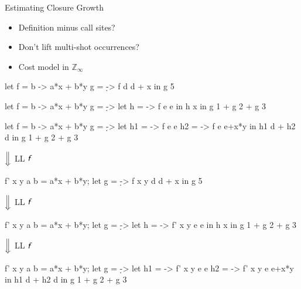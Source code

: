 \documentclass{haskellbeamer}
\newcommand{\id}[1]{\textsf{\textsl{#1}}\xspace}
\newcommand{\idf}{\id{f}}
\begin{document}
\begin{frame}[fragile]{Estimating Closure Growth}
  \begin{center}
    \begin{minipage}{0.45\textwidth}
      \begin{itemize}
        \item<3-> Definition minus call sites? 
        \item<6-> Don't lift multi-shot occurrences? 
        \item<8-> Cost model in $\mathbb{Z}_\infty$ 
      \end{itemize}
    \end{minipage}%
    \begin{minipage}{0.55\textwidth}
      \begin{overprint}
        \begin{haskell}
          let f = \a b -> a*x + b*y
              g = \d -> f d d + x
          in g 5
        \end{haskell}
        \begin{haskell}
          let f = \a b -> a*x + b*y
              g = \d ->
                let h = \e -> f e e
                in h x
          in g 1 + g 2 + g 3
        \end{haskell}
        \begin{haskell}
          let f = \a b -> a*x + b*y
              g = \d ->
                let h1 = \e -> f e e
                    h2 = \e -> f e e+x*y
                in h1 d + h2 d
          in g 1 + g 2 + g 3
        \end{haskell}
      \end{overprint}
      \begin{overprint}
        \hspace{0.4\textwidth}$\Big\Downarrow$ LL $\idf$
        \begin{haskell}
          f' x y a b = a*x + b*y;
          let g = \d -> f x y d d + x
          in g 5
        \end{haskell}
        \hspace{0.4\textwidth}$\Big\Downarrow$ LL $\idf$
        \begin{haskell}
          f' x y a b = a*x + b*y;
          let g = \d ->
                let h = \e -> f' x y e e
                in h x
          in g 1 + g 2 + g 3
        \end{haskell}
        \hspace{0.4\textwidth}$\Big\Downarrow$ LL $\idf$
        \begin{haskell}
          f' x y a b = a*x + b*y;
          let g = \d ->
                let h1 = \e -> f' x y e e
                    h2 = \e -> f' x y e e+x*y
                in h1 d + h2 d
          in g 1 + g 2 + g 3
        \end{haskell}
      \end{overprint}
    \end{minipage}
  \end{center}
\end{frame}
\end{document}
